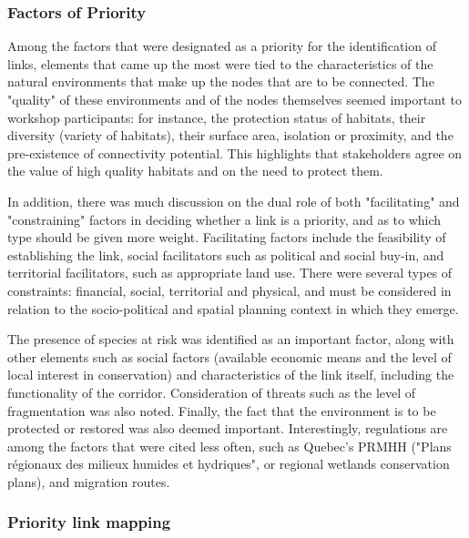 \subsubsection*{Factors of Priority}

Among the factors that were designated as a priority for the identification of links, elements that came up the most were tied to the characteristics of the natural environments that make up the nodes that are to be connected. The "quality" of these environments and of the nodes themselves seemed important to workshop participants: for instance, the protection status of habitats, their diversity (variety of habitats), their surface area, isolation or proximity, and the pre-existence of connectivity potential. This highlights that stakeholders agree on the value of high quality habitats and on the need to protect them.

In addition, there was much discussion on the dual role of both "facilitating" and "constraining" factors in deciding whether a link is a priority, and as to which type should be given more weight. Facilitating factors include the feasibility of establishing the link, social facilitators such as political and social buy-in, and territorial facilitators, such as appropriate land use. There were several types of constraints: financial, social, territorial and physical, and must be considered in relation to the socio-political and spatial planning context in which they emerge. %

The presence of species at risk was identified as an important factor, along with other elements such as social factors (available economic means and the level of local interest in conservation) and characteristics of the link itself, including the functionality of the corridor. Consideration of threats such as the level of fragmentation was also noted. Finally, the fact that the environment is to be protected or restored was also deemed important. Interestingly, regulations are among the factors that were cited less often, such as Quebec's PRMHH ("Plans régionaux des milieux humides et hydriques", or regional wetlands conservation plans), and migration routes. \\

\subsubsection*{Priority link mapping}

